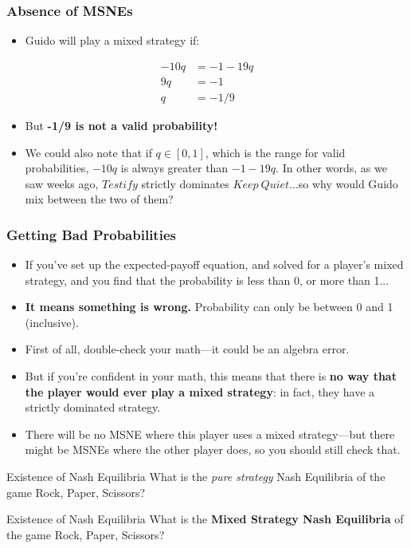 \begin{frame}
\frametitle{Absence of MSNEs}
\begin{itemize}
\item Guido will play a mixed strategy if:
\end{itemize}
\begin{align*}
-10q &= -1 - 19q\\
9q &= -1\\
q &= -1/9
\end{align*}
\begin{itemize}
  \item But \textbf{-1/9 is not a valid probability!}
\item We could also note that if $q\in [0, 1]$, which is the range for valid probabilities, $-10q$ is always greater than $-1 - 19q$. In other words, as we saw weeks ago, $Testify$ strictly dominates $Keep~Quiet$...so why would Guido mix between the two of them?
\end{itemize}
\end{frame}

\begin{frame}
\frametitle{Getting Bad Probabilities}
\begin{itemize}
	\item If you've set up the expected-payoff equation, and solved for a player's mixed strategy, and you find that the probability is less than 0, or more than 1...
	\item \textbf{It means something is wrong.} Probability can only be between 0 and 1 (inclusive).
	\item First of all, double-check your math---it could be an algebra error.
	\item But if you're confident in your math, this means that there is \textbf{no way that the player would ever play a mixed strategy}: in fact, they have a strictly dominated strategy.
	\item There will be no MSNE where this player uses a mixed strategy---but there might be MSNEs where the other player does, so you should still check that.
\end{itemize}
\end{frame}

\begin{frame}{Existence of Nash Equilibria}
  What is the \textit{pure strategy} Nash Equilibria of the game
  \alert{Rock, Paper, Scissors}?
\end{frame}

\begin{frame}{Existence of Nash Equilibria}
  What is the \textbf{Mixed Strategy Nash Equilibria} of the game
  \alert{Rock, Paper, Scissors}?
\end{frame}

